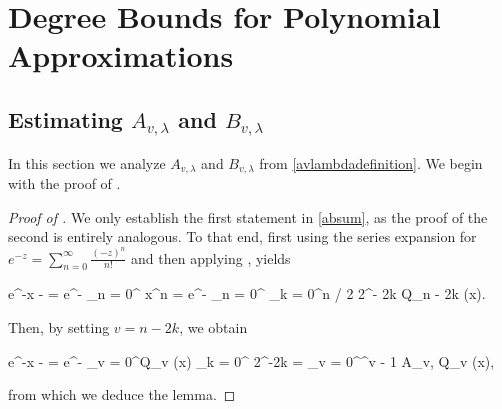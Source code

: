 	
	
	
	
	
	
	
	













\section{Degree Bounds for Polynomial Approximations}

\label{ProofEstimate}


	
	
	
	
	
	
	\subsection{Estimating $A_{v, \lambda}$ and $B_{v, \lambda}$}
	
	
	\label{Proofavlambdabvlambda}
	
	
	
	In this section we analyze $A_{v, \lambda}$ and $B_{v, \lambda}$ from \eqref{avlambdadefinition}. We begin with the proof of .
	
	\begin{proof}[Proof of ] 
	
	We only establish the first statement in \eqref{absum}, as the proof of the second is entirely analogous. To that end, first using the series expansion for $e^{-z} = \sum_{n = 0}^{\infty} \frac{(-z)^n}{n!}$ and then applying , yields
	\begin{flalign*}
	e^{-\lambda x - \lambda} = e^{-\lambda} \displaystyle\sum_{n = 0}^{\infty} \displaystyle{} x^n =  e^{-\lambda} \displaystyle\sum_{n = 0}^{\infty} \displaystyle{} \displaystyle\sum_{k = 0}^{\lfloor n / 2 \rfloor} 2^{- 2k}  Q_{n - 2k} (x).
	\end{flalign*}
	
	\noindent Then, by setting $v = n - 2k$, we obtain
	\begin{flalign*}
	e^{-\lambda x - \lambda} = e^{-\lambda} \displaystyle\sum_{v = 0}^\infty  Q_v (x) \displaystyle\sum_{k = 0}^{\infty}  \displaystyle{} 2^{-2k}  = \displaystyle\sum_{v = 0}^^{v - 1} A_{v, \lambda} Q_v (x),
	\end{flalign*} 
	
	\noindent from which we deduce the lemma. 
	\end{proof}
	
